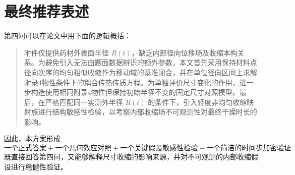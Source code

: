 \documentclass[UTF8,a4paper,12pt]{ctexart}
\begin{document}
\section{最终推荐表述}

第四问可以在论文中用下面的逻辑概括：

\begin{quote}
附件仅提供药材外表面半径 $R(t)$，缺乏内部径向位移场及收缩本构关系。为避免引入无法由题面数据辨识的额外参数，本文首先采用保持材料点径向次序的均匀相似收缩作为移动域的基准闭合，并在单位径向区间上求解附录4物性条件下的耦合传热传质方程。为单独评价尺寸变化的作用，进一步构造使用相同附录4物性但保持初始半径不变的固定尺寸对照模型。最后，在严格匹配同一实测外半径 $R(t)$ 的条件下，引入轻度非均匀收缩映射族进行结构敏感性检验，以考察内部收缩场不可观测性对最终干燥时长的影响。
\end{quote}

因此，本方案形成
\[
\boxed{
\text{一个正式答案}
+
\text{一个几何效应对照}
+
\text{一个关键假设敏感性检验}
+
\text{一个简洁的时间步加密验证}
}
\]
既直接回答第四问，又能够解释尺寸收缩的影响来源，并对不可观测的内部收缩假设进行稳健性验证。
\end{document}
